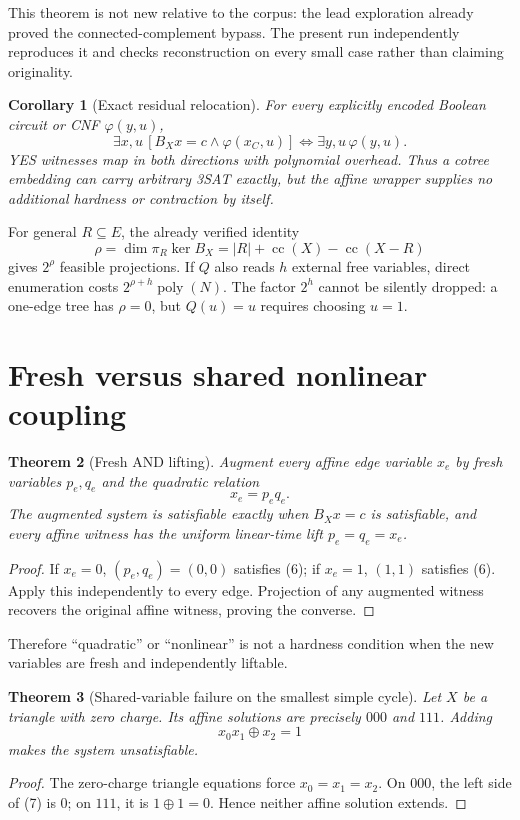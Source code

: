 \documentclass[11pt]{article}
\newtheorem{theorem}{Theorem}
\newtheorem{corollary}[theorem]{Corollary}
\begin{document}
This theorem is not new relative to the corpus: the lead exploration
 already
proved the connected-complement bypass.  The present run independently
reproduces it and checks reconstruction on every small case rather than
claiming originality.

\begin{corollary}[Exact residual relocation]
For every explicitly encoded Boolean circuit or CNF $\varphi(y,u)$,
\[
 \exists x,u\,[B_Xx=c\land\varphi(x_C,u)]
 \iff \exists y,u\,\varphi(y,u).                           \tag{4}
\]
YES witnesses map in both directions with polynomial overhead.  Thus a cotree
embedding can carry arbitrary 3SAT exactly, but the affine wrapper supplies no
additional hardness or contraction by itself.
\end{corollary}

For general $R\subseteq E$, the already verified identity
\[
 \rho=\dim\pi_R\ker B_X
      =|R|+\operatorname{cc}(X)-\operatorname{cc}(X-R)       \tag{5}
\]
gives $2^\rho$ feasible projections.  If $Q$ also reads $h$ external free
variables, direct enumeration costs $2^{\rho+h}\operatorname{poly}(N)$.
The factor $2^h$ cannot be silently dropped: a one-edge tree has $\rho=0$,
but $Q(u)=u$ requires choosing $u=1$.

\section{Fresh versus shared nonlinear coupling}
\begin{theorem}[Fresh AND lifting]
Augment every affine edge variable $x_e$ by fresh variables $p_e,q_e$ and the
quadratic relation
\[
 x_e=p_eq_e.                                                \tag{6}
\]
The augmented system is satisfiable exactly when $B_Xx=c$ is satisfiable, and
every affine witness has the uniform linear-time lift $p_e=q_e=x_e$.
\end{theorem}
\begin{proof}
If $x_e=0$, $(p_e,q_e)=(0,0)$ satisfies (6); if $x_e=1$, $(1,1)$ satisfies
(6).  Apply this independently to every edge.  Projection of any augmented
witness recovers the original affine witness, proving the converse.
\end{proof}

Therefore ``quadratic'' or ``nonlinear'' is not a hardness condition when the
new variables are fresh and independently liftable.

\begin{theorem}[Shared-variable failure on the smallest simple cycle]
Let $X$ be a triangle with zero charge.  Its affine solutions are precisely
$000$ and $111$.  Adding
\[
 x_0x_1\oplus x_2=1                                       \tag{7}
\]
makes the system unsatisfiable.
\end{theorem}
\begin{proof}
The zero-charge triangle equations force $x_0=x_1=x_2$.  On $000$, the left
side of (7) is $0$; on $111$, it is $1\oplus1=0$.  Hence neither affine
solution extends.
\end{proof}
\end{document}
